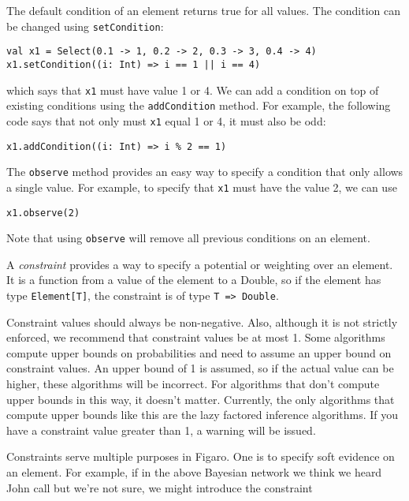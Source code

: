 The default condition of an element returns true for all values. The condition can be changed using \texttt{setCondition}:

\begin{flushleft}
\texttt{val x1 = Select(0.1 -> 1, 0.2 -> 2, 0.3 -> 3, 0.4 -> 4)
x1.setCondition((i: Int) => i == 1 || i == 4)}
\end{flushleft}

which says that \texttt{x1} must have value 1 or 4. We can add a condition on top of existing conditions using the \texttt{addCondition} method. For example, the following code says that not only must \texttt{x1} equal 1 or 4, it must also be odd:

\begin{flushleft}
\texttt{x1.addCondition((i: Int) => i \% 2 == 1)}
\end{flushleft}

The \texttt{observe} method provides an easy way to specify a condition that only allows a single value. For example, to specify that \texttt{x1} must have the value 2, we can use

\begin{flushleft}
\texttt{x1.observe(2)}
\end{flushleft}

Note that using \texttt{observe} will remove all previous conditions on an element.

A \emph{constraint} provides a way to specify a potential or weighting over an element. It is a function from a value of the element to a Double, so if the element has type \texttt{Element[T]}, the constraint is of type \texttt{T => Double}.

Constraint values should always be non-negative. Also, although it is not strictly enforced, we recommend that constraint values be at most 1. Some algorithms compute upper bounds on probabilities and need to assume an upper bound on constraint values. An upper bound of 1 is assumed, so if the actual value can be higher, these algorithms will be incorrect. For algorithms that don't compute upper bounds in this way, it doesn't matter. Currently, the only algorithms that compute upper bounds like this are the lazy factored inference algorithms. If you have a constraint value greater than 1, a warning will be issued.

Constraints serve multiple purposes in Figaro. One is to specify soft evidence on an element. For example, if in the above Bayesian network we think we heard John call but we're not sure, we might introduce the constraint

